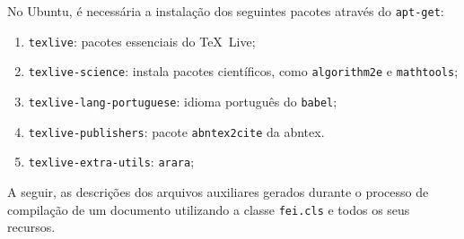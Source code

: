 \documentclass{fei}
\begin{document}
	No Ubuntu, é necessária a instalação dos seguintes pacotes através do \texttt{apt-get}:
	
	\begin{enumerate}
	\item \texttt{texlive}: pacotes essenciais do \TeX~Live;
	\item \texttt{texlive-science}: instala pacotes científicos, como \texttt{algorithm2e} e \texttt{mathtools};
	\item \texttt{texlive-lang-portuguese}: idioma português do \texttt{babel};
	\item \texttt{texlive-publishers}: pacote \texttt{abntex2cite} da \gls{abntex}.
	\item \texttt{texlive-extra-utils}: \texttt{arara};
	\end{enumerate}

	
	
	A seguir, as descrições dos arquivos auxiliares gerados durante o processo de compilação de um documento utilizando a classe \texttt{fei.cls} e todos os seus recursos.
		
\end{document}
